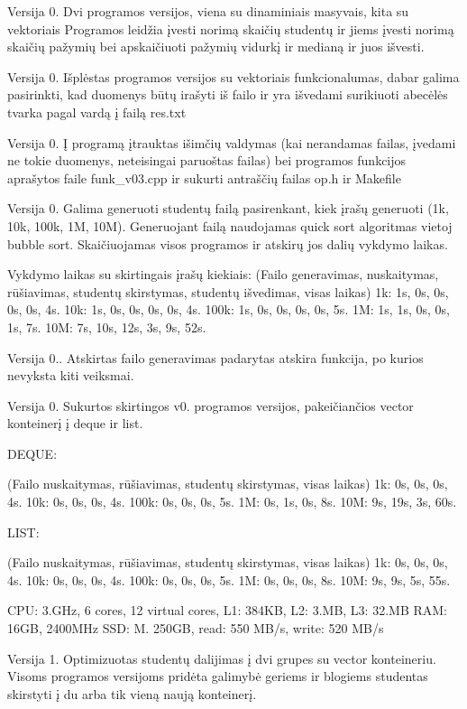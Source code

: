 Versija 0. Dvi programos versijos, viena su dinaminiais masyvais, kita su vektoriais Programos leidžia įvesti norimą skaičių studentų ir jiems įvesti norimą skaičių pažymių bei apskaičiuoti pažymių vidurkį ir medianą ir juos išvesti.

Versija 0. Išplėstas programos versijos su vektoriais funkcionalumas, dabar galima pasirinkti, kad duomenys būtų irašyti iš failo ir yra išvedami surikiuoti abecėlės tvarka pagal vardą į failą res.\+txt

Versija 0. Į programą įtrauktas išimčių valdymas (kai nerandamas failas, įvedami ne tokie duomenys, neteisingai paruoštas failas) bei programos funkcijos aprašytos faile funk\+\_\+v03.\+cpp ir sukurti antraščių failas op.\+h ir Makefile

Versija 0. Galima generuoti studentų failą pasirenkant, kiek įrašų generuoti (1k, 10k, 100k, 1M, 10M). Generuojant failą naudojamas quick sort algoritmas vietoj bubble sort. Skaičiuojamas visos programos ir atskirų jos dalių vykdymo laikas.

Vykdymo laikas su skirtingais įrašų kiekiais\+: (Failo generavimas, nuskaitymas, rūšiavimas, studentų skirstymas, studentų išvedimas, visas laikas) 1k\+: 1s, 0s, 0s, 0s, 0s, 4s. 10k\+: 1s, 0s, 0s, 0s, 0s, 4s. 100k\+: 1s, 0s, 0s, 0s, 0s, 5s. 1M\+: 1s, 1s, 0s, 0s, 1s, 7s. 10M\+: 7s, 10s, 12s, 3s, 9s, 52s.

Versija 0.. Atskirtas failo generavimas padarytas atskira funkcija, po kurios nevyksta kiti veiksmai.

Versija 0. Sukurtos skirtingos v0. programos versijos, pakeičiančios vector konteinerį į deque ir list.

DEQUE\+:

(Failo nuskaitymas, rūšiavimas, studentų skirstymas, visas laikas) 1k\+: 0s, 0s, 0s, 4s. 10k\+: 0s, 0s, 0s, 4s. 100k\+: 0s, 0s, 0s, 5s. 1M\+: 0s, 1s, 0s, 8s. 10M\+: 9s, 19s, 3s, 60s.

LIST\+:

(Failo nuskaitymas, rūšiavimas, studentų skirstymas, visas laikas) 1k\+: 0s, 0s, 0s, 4s. 10k\+: 0s, 0s, 0s, 4s. 100k\+: 0s, 0s, 0s, 5s. 1M\+: 0s, 0s, 0s, 8s. 10M\+: 9s, 9s, 5s, 55s.

CPU\+: 3.\+GHz, 6 cores, 12 virtual cores, L1\+: 384KB, L2\+: 3.\+MB, L3\+: 32.\+MB RAM\+: 16GB, 2400MHz SSD\+: M. 250GB, read\+: 550 MB/s, write\+: 520 MB/s

Versija 1. Optimizuotas studentų dalijimas į dvi grupes su vector konteineriu. Visoms programos versijoms pridėta galimybė geriems ir blogiems studentas skirstyti į du arba tik vieną naują konteinerį.


